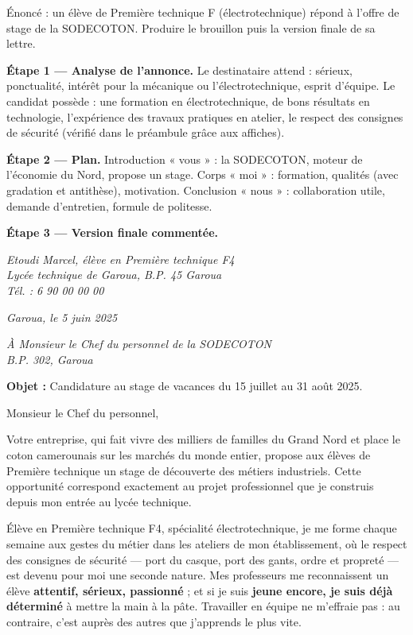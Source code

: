 \documentclass[11pt]{article}
\begin{document}
\begin{exoresolu}
Énoncé : un élève de Première technique F (électrotechnique) répond à l'offre de stage de la SODECOTON. Produire le brouillon puis la version finale de sa lettre.

\tcblower

\textbf{Étape 1 --- Analyse de l'annonce.} Le destinataire attend : sérieux, ponctualité, intérêt pour la mécanique ou l'électrotechnique, esprit d'équipe. Le candidat possède : une formation en électrotechnique, de bons résultats en technologie, l'expérience des travaux pratiques en atelier, le respect des consignes de sécurité (vérifié dans le préambule grâce aux affiches).

\textbf{Étape 2 --- Plan.} Introduction « vous » : la SODECOTON, moteur de l'économie du Nord, propose un stage. Corps « moi » : formation, qualités (avec gradation et antithèse), motivation. Conclusion « nous » : collaboration utile, demande d'entretien, formule de politesse.

\textbf{Étape 3 --- Version finale commentée.}

\begin{exemplebox}
\emph{Etoudi Marcel, élève en Première technique F4\\
Lycée technique de Garoua, B.P. 45 Garoua\\
Tél. : 6 90 00 00 00}

\emph{Garoua, le 5 juin 2025}

\emph{À Monsieur le Chef du personnel de la SODECOTON\\
B.P. 302, Garoua}

\textbf{Objet :} Candidature au stage de vacances du 15 juillet au 31 août 2025.

Monsieur le Chef du personnel,

Votre entreprise, qui fait vivre des milliers de familles du Grand Nord et place le coton camerounais sur les marchés du monde entier, propose aux élèves de Première technique un stage de découverte des métiers industriels. Cette opportunité correspond exactement au projet professionnel que je construis depuis mon entrée au lycée technique.

Élève en Première technique F4, spécialité électrotechnique, je me forme chaque semaine aux gestes du métier dans les ateliers de mon établissement, où le respect des consignes de sécurité --- port du casque, port des gants, ordre et propreté --- est devenu pour moi une seconde nature. Mes professeurs me reconnaissent un élève \textbf{attentif, sérieux, passionné} ; et si je suis \textbf{jeune encore, je suis déjà déterminé} à mettre la main à la pâte. Travailler en équipe ne m'effraie pas : au contraire, c'est auprès des autres que j'apprends le plus vite.


\end{exemplebox}
\end{exoresolu}
\end{document}
